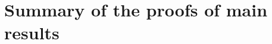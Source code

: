 \documentclass[11pt]{amsart}
\theoremstyle{plain}
\newtheorem{theorem}{Theorem}[section]
\theoremstyle{definition}
\numberwithin{equation}{section}
\newcommand{\T}{\mathcal T}
\newcommand{\E}{\mathcal E}
\DeclareMathOperator{\red}{red}
\begin{document}








\section{Summary of the proofs of main results}
\end{document}
